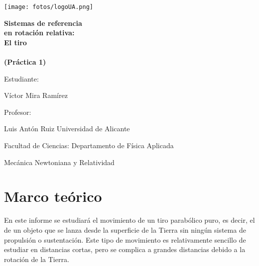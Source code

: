 \documentclass[11pt]{article}
\newcommand{\titulo}{Sistemas de referencia\\ en rotación relativa:\\
El tiro\\\ \\(Práctica 1)}
\newcommand{\nombreestudiante}{Víctor Mira Ramírez}
\newcommand{\nombredirector}{Luis Antón Ruiz}
\newcommand{\fecha}{\date{Diciembre 2023}}
\begin{document}
    \begin{titlepage}
    	\centering
    	\texttt{[image: fotos/logoUA.png]}\par
    	\vspace{1cm}
    	{\huge\bfseries \vspace{15mm} \titulo \par}
    	\vfill
    	{\large 
    	\vfill
    	Estudiante:\par\vspace{2mm}
    	\nombreestudiante\par
    	\vfill
    	Profesor:\par\vspace{2mm}
        \nombredirector
        \vfill
        Universidad de Alicante\par
        Facultad de Ciencias: Departamento de Física Aplicada\par
        Mecánica Newtoniana y Relatividad\par
    	\fecha\par}
    \end{titlepage}
    
    \clearpage

    \begin{abstract}\label{sec:abstract}
        Este informe examina el impacto de la rotación de la Tierra en la trayectoria de proyectiles mediante dos enfoques. Se aborda el tiro parabólico puro en dos sistemas de referencia: uno fijo y otro rotativo con la Tierra, empleando modelos y programas en Python. Estos enfoques conjuntos ofrecen una comprensión completa del fenómeno, subrayando la importancia de considerar la rotación terrestre al apuntar proyectiles a distancias significativas.
    \end{abstract}\vspace{0.3cm}  
    
    \tableofcontents
    \clearpage

    \section{Marco teórico}     
        \noindent En este informe se estudiará el movimiento de un tiro parabólico puro, es decir, el de un objeto que se lanza desde la superficie de la Tierra sin ningún sistema de propulsión o sustentación. Este tipo de movimiento es relativamente sencillo de estudiar en distancias cortas, pero se complica a grandes distancias debido a la rotación de la Tierra.\\
\end{document}
